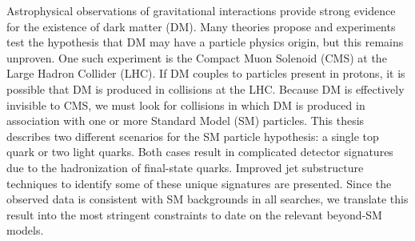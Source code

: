 % 
% 
%

Astrophysical observations of gravitational interactions provide strong evidence for the existence of dark matter (DM). 
Many theories propose and experiments test the hypothesis that DM may have a particle physics origin, but this remains unproven. 
One such experiment is the Compact Muon Solenoid (CMS) at the Large Hadron Collider (LHC). 
If DM couples to particles present in protons, it is possible that DM is produced in collisions at the LHC. 
Because DM is effectively invisible to CMS, we must look for collisions in which DM is produced in association with one or more Standard Model (SM) particles. 
This thesis describes two different scenarios for the SM particle hypothesis: a single top quark or two light quarks. 
Both cases result in complicated detector signatures due to the hadronization of final-state quarks. 
Improved jet substructure techniques to identify some of these unique signatures are presented. 
Since the observed data is consistent with SM backgrounds in all searches, we translate this result into the most stringent constraints to date on the relevant beyond-SM models.

